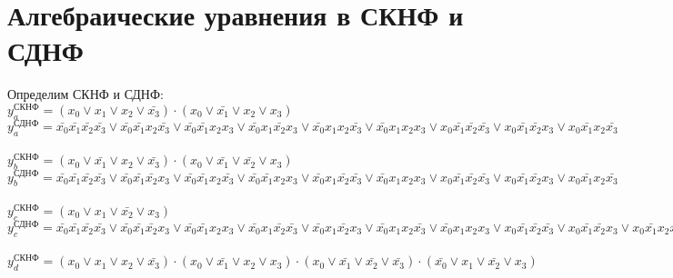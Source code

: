 \documentclass{bmstu}
\begin{document}
	\section{Алгебраические уравнения в СКНФ и СДНФ}
	Определим СКНФ и СДНФ: \\
	$y^{\text{СКНФ}}_a = (x_0 \vee x_1 \vee x_2 \vee \bar{x_3}) \cdot
						 (x_0 \vee \bar{x_1} \vee x_2 \vee x_3) $ \\
	$y^{\text{СДНФ}}_a = \bar{x_0} \bar{x_1} \bar{x_2} \bar{x_3} \vee
						 \bar{x_0} \bar{x_1} x_2 \bar{x_3} \vee 
						 \bar{x_0} \bar{x_1} x_2 x_3 \vee
						 \bar{x_0} x_1 \bar{x_2} x_3 \vee 
					     \bar{x_0} x_1 x_2 \bar{x_3} \vee 
						 \bar{x_0} x_1 x_2 x_3 \vee 
	                     x_0 \bar{x_1} \bar{x_2} \bar{x_3} \vee 
	                     x_0 \bar{x_1} \bar{x_2} x_3 \vee 
	                     x_0 \bar{x_1} x_2 \bar{x_3}$
	\\
	\\             
	$y^{\text{СКНФ}}_b = (x_0 \vee \bar{x_1} \vee x_2 \vee \bar{x_3}) \cdot 
						 (x_0 \vee \bar{x_1} \vee \bar{x_2} \vee x_3)$ \\ 
	$y^{\text{СДНФ}}_b = \bar{x_0} \bar{x_1} \bar{x_2} \bar{x_3} \vee 
						 \bar{x_0} \bar{x_1} \bar{x_2} x_3 \vee
						 \bar{x_0} \bar{x_1} x_2 \bar{x_3} \vee 
						 \bar{x_0} \bar{x_1} x_2 x_3 \vee
						 \bar{x_0} x_1 \bar{x_2} \bar{x_3} \vee 
						 \bar{x_0} x_1 x_2 x_3 \vee 
						 x_0 \bar{x_1} \bar{x_2} \bar{x_3} \vee 
						 x_0 \bar{x_1} \bar{x_2} x_3 \vee 
						 x_0 \bar{x_1} x_2 \bar{x_3}$ 
	\\
	\\
	$y^{\text{СКНФ}}_c = (x_0 \vee x_1 \vee \bar{x_2} \vee x_3)$ \\           
    $y^{\text{СДНФ}}_c = \bar{x_0} \bar{x_1} \bar{x_2} \bar{x_3} \vee
    					 \bar{x_0} \bar{x_1} \bar{x_2} x_3 \vee 
    					 \bar{x_0} \bar{x_1} x_2 x_3 \vee
    					 \bar{x_0} x_1 \bar{x_2} \bar{x_3} \vee 
				     	 \bar{x_0} x_1 \bar{x_2} x_3 \vee 
    					 \bar{x_0} x_1 x_2 \bar{x_3} \vee 
    					 \bar{x_0} x_1 x_2 x_3 \vee 
    					 x_0 \bar{x_1} \bar{x_2} \bar{x_3} \vee 
    					 x_0 \bar{x_1} \bar{x_2} x_3 \vee 
        				 x_0 \bar{x_1} x_2 \bar{x_3}$
	\\
	\\
    $y^{\text{СКНФ}}_d = (x_0 \vee x_1 \vee x_2 \vee \bar{x_3}) \cdot
    					 (x_0 \vee \bar{x_1} \vee x_2 \vee x_3) \cdot 
    					 (x_0 \vee \bar{x_1} \vee \bar{x_2} \vee \bar{x_3}) \cdot 
    					 (\bar{x_0} \vee x_1  \vee \bar{x_2} \vee x_3)$ \\
\end{document}
